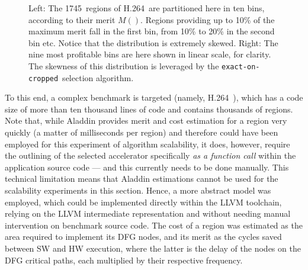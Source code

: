 \documentclass[]{usiinfthesis}
\newcommand{\htsf}{{H.264}}
\newcommand{\exactC}{\texttt{exact-on-cropped}}
\newcommand{\numofhtsfregs}{1745} %
\begin{document}
\begin{figure}[h]
\centering
  \hspace*{-2cm}
  \hspace*{-2cm}
\caption{Left: The \numofhtsfregs\ regions of \htsf\ are partitioned here
  in ten bins, according to their merit $M()$. Regions providing up to
  10\% of the maximum merit fall in the first bin, from 10\% to 20\%
  in the second bin etc. Notice that the distribution is extremely
  skewed.  Right: The nine most profitable bins are here shown in linear
  scale, for clarity.  The skewness of this distribution is leveraged
  by the \exactC\ selection algorithm.  }
\label{fig:h264-regions}
\end{figure}

To this end, a complex benchmark is targeted (namely, \htsf\
\cite{H264May15}), which has a code size of more than ten thousand
lines of code and contains thousands of regions. Note that, while
Aladdin provides merit and cost estimation for a region very quickly
(a matter of milliseconds per region) and therefore could have been
employed for this experiment of algorithm scalability, it does,
however, require the outlining of the selected accelerator
specifically \emph{as a function call} within the application source
code --- and this currently needs to be done manually. This technical
limitation means that Aladdin estimations cannot be used for the
scalability experiments in this section.
Hence, a more abstract model was employed, which could be implemented
directly within the LLVM toolchain, relying on the LLVM intermediate
representation and without needing manual intervention on benchmark
source code. The cost of a region was estimated as the area required to
implement its DFG nodes, and its merit as the cycles saved between SW
and HW execution, where the latter is the delay of the nodes on the
DFG critical paths, each multiplied by their respective frequency.\par
\end{document}
